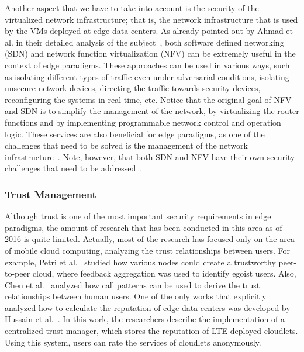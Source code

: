\documentclass[twocolumn,preprint,3p]{elsarticle}
\begin{document}
Another aspect that we have to take into account is the security of the virtualized network infrastructure; that is, the network infrastructure that is used by the VMs deployed at edge data centers. As already pointed out by Ahmad et al. in their detailed analysis of the subject~\cite{AhmadSDN15}, both software defined networking (SDN) and network function virtualization (NFV) can be extremely useful in the context of edge paradigms. These approaches can be used in various ways, such as isolating different types of traffic even under adversarial conditions, isolating unsecure network devices, directing the traffic towards security devices, reconfiguring the systems in real time, etc. Notice that the original goal of NFV and SDN is to simplify the management of the network, by virtualizing the router functions and by implementing programmable network control and operation logic. These services are also beneficial for edge paradigms, as one of the challenges that need to be solved is the management of the network infrastructure~\cite{Kreutz15,YongNFV15}. Note, however, that both SDN and NFV have their own security challenges that need to be addressed~\cite{AhmadSDN15,Chen2016}.

\subsubsection{Trust Management}

Although trust is one of the most important security requirements in edge paradigms, the amount of research that has been conducted in this area as of 2016 is quite limited. Actually, most of the research has focused only on the area of mobile cloud computing, analyzing the trust relationships between users. For example, Petri et al.~\cite{Petri12} studied how various nodes could create a trustworthy peer-to-peer cloud, where feedback aggregation was used to identify egoist users. Also, Chen et al.~\cite{ChenT13} analyzed how call patterns can be used to derive the trust relationships between human users. One of the only works that explicitly analyzed how to calculate the reputation of edge data centers was developed by Hussain et al.~\cite{HussainT14}. In this work, the researchers describe the implementation of a centralized trust manager, which stores the reputation of LTE-deployed cloudlets. Using this system, users can rate the services of cloudlets anonymously.
\end{document}
